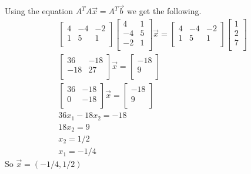 		    Using the equation $A^TA\vec{x}=A^T\vec{b}$ we get the following. 
			    \begin{gather*}
			        \begin{bmatrix}
			        4 & -4 & -2 \\
			        1 & 5 & 1 \\
			        \end{bmatrix}
			        \begin{bmatrix}
			        4 & 1 \\
			        -4 & 5 \\
			        -2 & 1 \\
			        \end{bmatrix}
			        \vec{x}
			        =
			        \begin{bmatrix}
			        4 & -4 & -2 \\
			        1 & 5 & 1 \\
			        \end{bmatrix}
			        \begin{bmatrix}
			        1 \\
			        2 \\
			        7 \\
			        \end{bmatrix} 
			        \\
			        \begin{bmatrix}
			        36 & -18 \\
			        -18 & 27 \\
			        \end{bmatrix}
			        \vec{x}= \begin{bmatrix}
			        -18 \\
			        9 \\
			        \end{bmatrix}
			        \\
			        \begin{bmatrix}
			        36 & -18 \\
			        0 & -18 \\
			        \end{bmatrix}
			        \vec{x}= \begin{bmatrix}
			        -18 \\
			        9 \\
			        \end{bmatrix} 
			        \\
			        36x_1-18x_2=-18
			        \\
			        18x_2=9
			        \\
			        x_2=1/2
			        \\
			        x_1=-1/4
			    \end{gather*}
			    So $\vec{x}=(-1/4, 1/2)$
